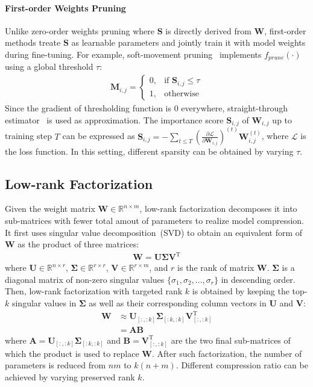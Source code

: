 \paragraph{First-order Weights Pruning} Unlike zero-order weights pruning where $\bm{S}$ is directly derived from $\bm{W}$, first-order methods treate $\bm{S}$ as learnable parameters and jointly train it with model weights during fine-tuning. For example, soft-movement pruning~\cite{movement} implements $f_{prune}(\cdot)$ using a global threshold $\tau$:
\begin{align}
	\bm{M}_{i,j}=
	\begin{cases} 
		0, & \text{if }\bm{S}_{i,j}\le \tau\\
		1,  & \text{otherwise}  
	\end{cases}
	\label{eq:first}
\end{align}
Since the gradient of thresholding function is 0 everywhere, straight-through estimator~\cite{st} is used as approximation. The importance score $\bm{S}_{i,j}$ of $\bm{W}_{i,j}$ up to training step $T$ can be expressed as $\bm{S}_{i,j}=-\sum_{t\le T}(\frac{\partial \mathcal{L}}{\partial \bm{W}_{i,j}})^{(t)} \bm{W}_{i,j}^{(t)}$, where $\mathcal{L}$ is the loss function.
In this setting, different sparsity can be obtained by varying $\tau$.


\subsection{Low-rank Factorization}
\label{sec:lr}
Given the weight matrix $\bm{W}\in \mathbb{R}^{n\times m}$, low-rank factorization decomposes it into sub-matrices with fewer total amout of parameters to realize model compression.  It first uses singular value decomposition~(SVD) to obtain an equivalent form of $\bm{W}$ as the product of three matrices:
\begin{align}
	\bm{W}=\bm{U}\bm{\Sigma}\bm{V}^\mathrm{T}
\end{align}
where $\bm{U}\in \mathbb{R}^{n\times r}$, $\bm{\Sigma}\in  \mathbb{R}^{r\times r}$, $\bm{V}\in \mathbb{R}^{r\times m}$, and $r$ is the rank of matrix $\bm{W}$. $\bm{\Sigma}$ is a diagonal matrix of non-zero singular values $\{\sigma_1, \sigma_2,...,\sigma_r\}$ in descending order. Then, low-rank factorization with targeted rank $k$ is obtained by keeping the top-$k$ singular values in $\bm{\Sigma}$ as well as their corresponding column vectors in $\bm{U}$ and $\bm{V}$:
\begin{align}
	\bm{W}&\approx \bm{U}_{[:, :k]}\bm{\Sigma}_{[:k,:k]}\bm{V}_{[:, :k]}^{\mathrm{T}} \\
	&=\bm{A}\bm{B}
	\label{eq:svd}
\end{align}
where $\bm{A}=\bm{U}_{[:,:k]}\bm{\Sigma}_{[:k,:k]}$ and $\bm{B}=\bm{V}_{[:,:k]}^{\mathrm{T}}$ are the two final sub-matrices of which the product is used to replace $\bm{W}$. After such factorization, the number of parameters is reduced from $nm$ to $k(n+m)$. Different compression ratio can be achieved by varying preserved rank $k$.


